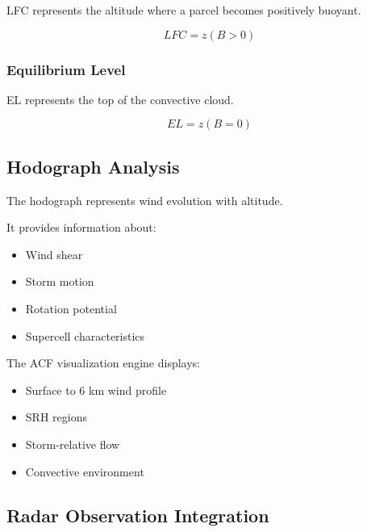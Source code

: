 LFC represents the altitude where a parcel becomes positively buoyant.

\[
LFC=z(B>0)
\]


\subsubsection{Equilibrium Level}

EL represents the top of the convective cloud.

\[
EL=z(B=0)
\]


\subsection{Hodograph Analysis}

The hodograph represents wind evolution with altitude.

It provides information about:

\begin{itemize}

\item Wind shear

\item Storm motion

\item Rotation potential

\item Supercell characteristics

\end{itemize}


The ACF visualization engine displays:

\begin{itemize}

\item Surface to 6 km wind profile

\item SRH regions

\item Storm-relative flow

\item Convective environment

\end{itemize}

\subsection{Radar Observation Integration}


